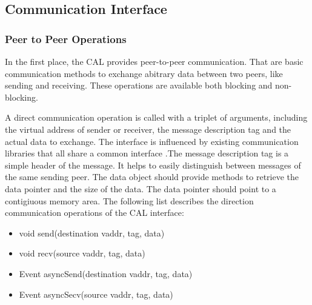 \subsection{Communication Interface}
\label{sec:cal_comm}
\subsubsection{Peer to Peer Operations}

In the first place, the CAL provides peer-to-peer communication. That
are basic communication methods to exchange abitrary data between two
peers, like sending and receiving.  These operations are available
both blocking and non-blocking.


A direct communication operation is called with a triplet of
arguments, including the virtual address of sender or receiver, the
message description tag and the actual data to exchange.  The
interface is influenced by existing communication libraries that all
share a common interface \cite{ref:boost_mpi, ref:boost_asio,
  ref:zmq}.The message description tag is a simple header of the
message. It helps to easily distinguish between messages of the same
sending peer.  The data object should provide methods to retrieve the
data pointer and the size of the data. The data pointer should point
to a contigiuous memory area. The following list describes the
direction communication operations of the CAL interface:

\begin{itemize}
  \item void send(destination vaddr, tag, data)
  \item void recv(source vaddr, tag, data)
  \item Event asyncSend(destination vaddr, tag, data)
  \item Event asyncSecv(source vaddr, tag, data)
\end{itemize}


